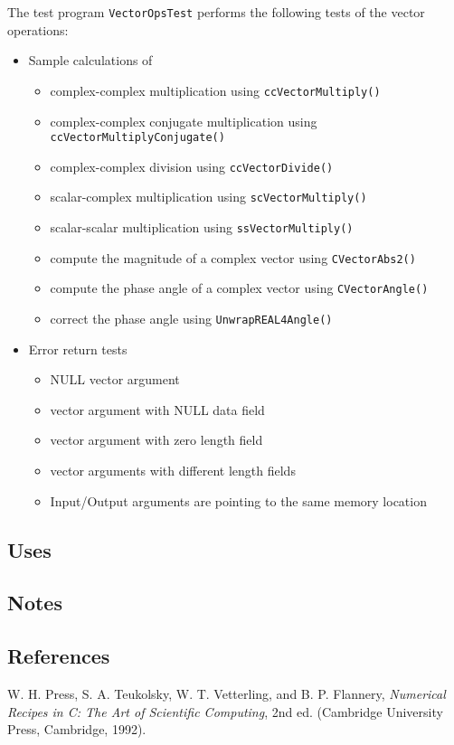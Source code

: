 \documentclass{article}
\begin{document}
The test program \texttt{VectorOpsTest} performs the following tests of
the vector operations:
\begin{itemize}
\item Sample calculations of
\begin{itemize}
\item complex-complex multiplication using \texttt{ccVectorMultiply()}
\item complex-complex conjugate multiplication using
  \texttt{ccVectorMultiplyConjugate()}
\item complex-complex division using \texttt{ccVectorDivide()}
\item scalar-complex multiplication using \texttt{scVectorMultiply()}
\item scalar-scalar multiplication using \texttt{ssVectorMultiply()}
\item compute  the magnitude of a complex vector using
      \texttt{CVectorAbs2()}
\item compute  the phase angle of a complex vector using
      \texttt{CVectorAngle()}
\item correct  the phase angle  using
           \texttt{UnwrapREAL4Angle()}
\end{itemize}
\item Error return tests
\begin{itemize}
\item NULL vector argument
\item vector argument with NULL data field
\item vector argument with zero length field
\item vector arguments with different length fields
\item Input/Output arguments are pointing to the same memory location
\end{itemize}
\end{itemize}

\subsection{Uses}


\subsection{Notes}

\subsection{References}

\begin{thebibliography}{0}
  W. H. Press, S. A. Teukolsky, W. T. Vetterling, and B. P. Flannery,
  \textit{Numerical Recipes in C: The Art of Scientific Computing}, 2nd ed.
  (Cambridge University Press, Cambridge, 1992).
\end{thebibliography}
\end{document}
